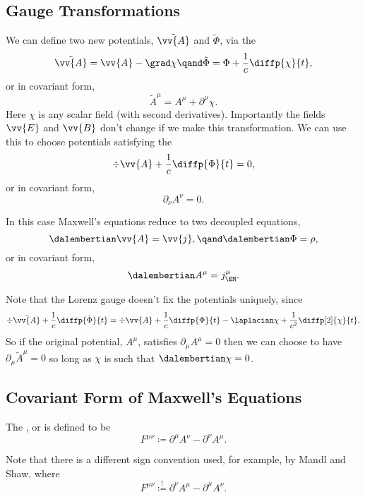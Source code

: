 \subsection{Gauge Transformations}
We can define two new potentials, \(\tilde{\vv{A}}\) and \(\tilde{\Phi}\), via the 
\begin{equation}
    \tilde{\vv{A}} = \vv{A} - \grad\chi \qand \tilde{\Phi} = \Phi + \frac{1}{c}\diffp{\chi}{t},
\end{equation}
or in covariant form,
\begin{equation}
    \tilde{A}^\mu = A^\mu + \partial^\mu \chi.
\end{equation}
Here \(\chi\) is any scalar field (with second derivatives).
Importantly the fields \(\vv{E}\) and \(\vv{B}\) don't change if we make this transformation.
We can use this to choose potentials satisfying the 
\begin{equation}
    \div \vv{A} + \frac{1}{c}\diffp{\Phi}{t} = 0,
\end{equation}
or in covariant form,
\begin{equation}
    \partial_\nu A^\nu = 0.
\end{equation}

In this case Maxwell's equations reduce to two decoupled equations,
\begin{equation}
    \dalembertian \vv{A} = \vv{j}, \qand \dalembertian\Phi = \rho,
\end{equation}
or in covariant form,
\begin{equation}
    \dalembertian A^\mu = j_{\EM}^{\mu}.
\end{equation}

Note that the Lorenz gauge doesn't fix the potentials uniquely, since
\begin{equation}
    \div\tilde{\vv{A}} + \frac{1}{c}\diffp{\tilde{\Phi}}{t} = \div\vv{A} + \frac{1}{c}\diffp{\Phi}{t} - \laplacian \chi + \frac{1}{c^2} \diffp[2]{\chi}{t}.
\end{equation}
So if the original potential, \(A^\mu\), satisfies \(\partial_\mu A^\mu = 0\) then we can choose to have \(\partial_\mu \tilde{A}^\mu = 0\) so long as \(\chi\) is such that \(\dalembertian\chi = 0\).

\subsection{Covariant Form of Maxwell's Equations}
The , or  is defined to be
\begin{equation}
    F^{\mu\nu} \coloneqq \partial^\mu A^\nu - \partial^\nu A^\mu.
\end{equation}
\begin{wrn}
    Note that there is a different sign convention used, for example, by Mandl and Shaw, where
    \begin{equation}
        F^{\mu\nu} \stackrel{!}{\coloneqq} \partial^\nu A^\mu - \partial^\mu A^\nu.
    \end{equation}
\end{wrn}

